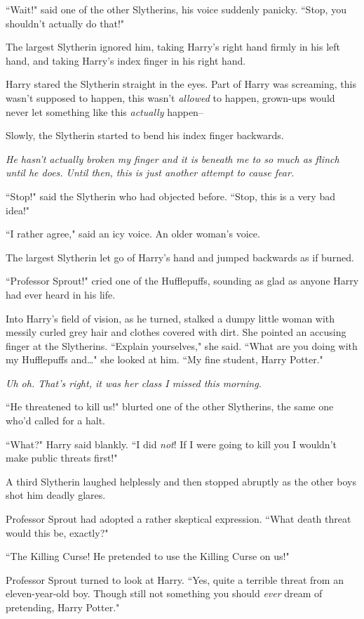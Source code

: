 ``Wait!" said one of the other Slytherins, his voice suddenly panicky. ``Stop, you shouldn't actually do that!"

The largest Slytherin ignored him, taking Harry's right hand firmly in his left hand, and taking Harry's index finger in his right hand.

Harry stared the Slytherin straight in the eyes. Part of Harry was screaming, this wasn't supposed to happen, this wasn't \emph{allowed} to happen, grown-ups would never let something like this \emph{actually} happen\---

Slowly, the Slytherin started to bend his index finger backwards.

\emph{He hasn't actually broken my finger and it is beneath me to so much as flinch until he does. Until then, this is just another attempt to cause fear.}

``Stop!" said the Slytherin who had objected before. ``Stop, this is a very bad idea!"

``I rather agree," said an icy voice. An older woman's voice.

The largest Slytherin let go of Harry's hand and jumped backwards as if burned.

``Professor Sprout!" cried one of the Hufflepuffs, sounding as glad as anyone Harry had ever heard in his life.

Into Harry's field of vision, as he turned, stalked a dumpy little woman with messily curled grey hair and clothes covered with dirt. She pointed an accusing finger at the Slytherins. ``Explain yourselves," she said. ``What are you doing with my Hufflepuffs and{\ldots}" she looked at him. ``My fine student, Harry Potter."

\emph{Uh oh. That's right, it was \emph{her} class I missed this morning.}

``He threatened to kill us!" blurted one of the other Slytherins, the same one who'd called for a halt.

``What?" Harry said blankly. ``I did \emph{not}! If I were going to kill you I wouldn't make public threats first!"

A third Slytherin laughed helplessly and then stopped abruptly as the other boys shot him deadly glares.

Professor Sprout had adopted a rather skeptical expression. ``What death threat would this be, exactly?"

``The Killing Curse! He pretended to use the Killing Curse on us!"

Professor Sprout turned to look at Harry. ``Yes, quite a terrible threat from an eleven-year-old boy. Though still not something you should \emph{ever} dream of pretending, Harry Potter."

